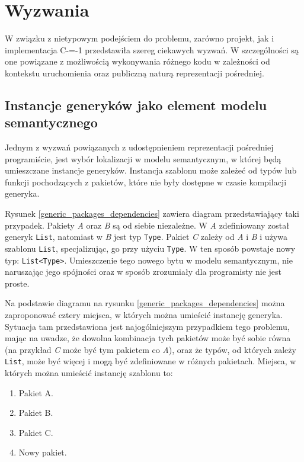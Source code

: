 \section{Wyzwania}

W związku z nietypowym podejściem do problemu, zarówno projekt, jak i implementacja C-=-1 przedstawiła szereg ciekawych wyzwań.
W szczególności są one powiązane z możliwością wykonywania różnego kodu w zależności od kontekstu uruchomienia oraz publiczną naturą reprezentacji pośredniej.

\subsection{Instancje generyków jako element modelu semantycznego}
\label{challenges:generic_instance_placement}
Jednym z wyzwań powiązanych z udostępnieniem reprezentacji pośredniej programiście, jest wybór lokalizacji w modelu semantycznym, w której będą umieszczane instancje generyków.
Instancja szablonu może zależeć od typów lub funkcji pochodzących z pakietów, które nie były dostępne w czasie kompilacji generyka.

Rysunek \ref{generic_packages_dependencies} zawiera diagram przedstawiający taki przypadek.
Pakiety \emph{A} oraz \emph{B} są od siebie niezależne.
W \emph{A} zdefiniowany został generyk \lstinline{List}, natomiast w \emph{B} jest typ \lstinline{Type}.
Pakiet \emph{C} zależy od \emph{A} i \emph{B} i używa szablonu \lstinline{List}, specjalizując, go przy użyciu \lstinline{Type}.
W ten sposób powstaje nowy typ: \lstinline{List<Type>}.
Umieszczenie tego nowego bytu w modelu semantycznym, nie naruszając jego spójności oraz w sposób zrozumiały dla programisty nie jest proste.

Na podstawie diagramu na rysunku \ref{generic_packages_dependencies} można zaproponować cztery miejsca, w których można umieścić instancję generyka.
Sytuacja tam przedstawiona jest najogólniejszym przypadkiem tego problemu, mając na uwadze, że dowolna kombinacja tych pakietów może być sobie równa (na przykład \emph{C} może być tym pakietem co \emph{A}), oraz że typów, od których zależy \lstinline{List}, może być więcej i mogą być zdefiniowane w różnych pakietach.
Miejsca, w których można umieścić instancję szablonu to: \begin{enumerate}
	\item \label{generic_location:A} Pakiet A.
	\item \label{generic_location:B} Pakiet B.
	\item \label{generic_location:C} Pakiet C.
	\item \label{generic_location:new} Nowy pakiet.
\end{enumerate}

